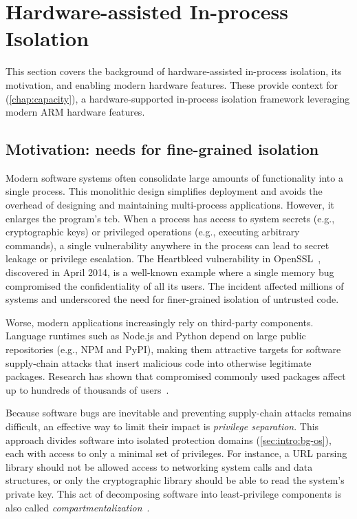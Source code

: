\clearpage

\section{Hardware-assisted In-process Isolation}\label{sec:intro:bg-ipi}

This section covers the background of hardware-assisted in-process isolation, its motivation, and enabling modern hardware features.
These provide context for \capacity (\cref{chap:capacity}), a hardware-supported in-process isolation framework leveraging modern ARM hardware features.

\subsection{Motivation: needs for fine-grained isolation}


Modern software systems often consolidate large amounts of functionality into a single process.
This monolithic design simplifies deployment and avoids the overhead of designing and maintaining multi-process applications.
However, it enlarges the program's \gls{tcb}. When a process has access to system secrets (e.g., cryptographic keys) or privileged operations (e.g., executing arbitrary commands), a single vulnerability anywhere in the process can lead to secret leakage or privilege escalation.
The Heartbleed vulnerability in OpenSSL~\cite{heartbleed}, discovered in April 2014, is a well-known example where a single memory bug compromised the confidentiality of all its users.
The incident affected millions of systems and underscored the need for finer-grained isolation of untrusted code.

Worse, modern applications increasingly rely on third-party components.
Language runtimes such as Node.js and Python depend on large public repositories (e.g., NPM and PyPI), making them attractive targets for software supply-chain attacks that insert malicious code into otherwise legitimate packages.
Research has shown that compromised commonly used packages affect up to hundreds of thousands of users~\cite{vasilakis_supply-chain_2021}.

Because software bugs are inevitable and preventing supply-chain attacks remains difficult, an effective way to limit their impact is \emph{privilege separation}.
This approach divides software into isolated protection domains (\cref{sec:intro:bg-os}), each with access to only a minimal set of privileges.
For instance, a URL parsing library should not be allowed access to networking system calls and data structures, or only the cryptographic library should be able to read the system's private key.
This act of decomposing software into least-privilege components is also called \emph{compartmentalization}~\cite{hugo2025sok}.


